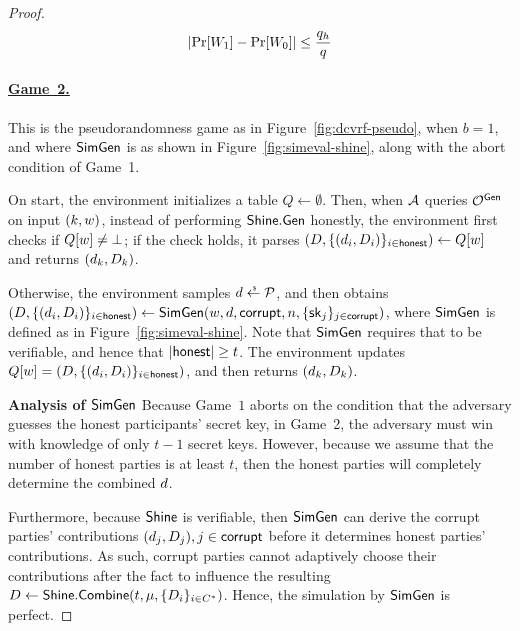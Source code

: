 \begin{proof}
  \begin{equation} \label{eq:dcvrf-game1}
    \lvert \Pr[W_1] - \Pr[W_0] \rvert \leq \frac{q_h}{q}
  \end{equation}

  \paragraph{\underline{Game~2.}}
  This is the pseudorandomness game as in Figure~\ref{fig:dcvrf-pseudo},
  when $b=1$,
  and where $\mathsf{SimGen}$ is as shown in Figure~\ref{fig:simeval-shine},
  along with the abort condition of Game~1.

  On start,
  the environment initializes a table $Q \gets \emptyset$.
  Then, when $\mathcal{A}$ queries $\mathcal{O}^{\mathsf{Gen}}$ on input $(k, w)$,
  instead of performing $\mathsf{Shine}.\mathsf{Gen}$ honestly,
  the environment first checks if $Q[w] \neq \bot$;
  if the check holds,
  it parses
  $(D, \{ (d_i, D_i)\}_{i \in \mathsf{honest}} ) \gets Q[w]$ and
  returns $(d_k, D_k)$.

  Otherwise, the environment samples $\vrfprivout \rgets \vrfprivdomain$,
  and then obtains
  $(D, \{ (d_i, D_i)\}_{i \in \mathsf{honest}} ) \gets \mathsf{SimGen}(w, d, \mathsf{corrupt}, n, \allowbreak \{ \mathsf{sk}_j\}_{j \in \mathsf{corrupt}})$,
  where $\mathsf{SimGen}$ is defined as in Figure~\ref{fig:simeval-shine}.
  Note that $\mathsf{SimGen}$ requires that \DVRFOne to be verifiable,
  and hence that $\lvert \mathsf{honest} \rvert \geq t$.
  The environment updates $Q[w] = (D, \{ (d_i, D_i)\}_{i \in \mathsf{honest}})$,
  and then returns $(d_k, D_k)$.

  \medskip

  \noindent \textbf{Analysis of $\mathsf{SimGen}$}
  Because Game~$1$ aborts on the condition that the adversary guesses the honest participants' secret key,
  in Game~2,
  the adversary must win with knowledge of only $t-1$ secret keys.
  However, because we assume that the number of honest parties is at least $t$,
  then the honest parties will completely determine the combined $d$.

  Furthermore,
  because $\mathsf{Shine}$ is verifiable,
  then $\mathsf{SimGen}$ can derive the corrupt parties' contributions $(d_j, D_j), j \in \mathsf{corrupt}$ before it determines honest parties' contributions.
  As such,  corrupt parties cannot adaptively choose their contributions after
  the fact to influence the resulting
  $D \gets  \mathsf{Shine}.\mathsf{Combine}(t, \mu, \{ D_i\}_{i \in C^*})$.
  Hence, the simulation by $\mathsf{SimGen}$ is perfect.


\end{proof}
